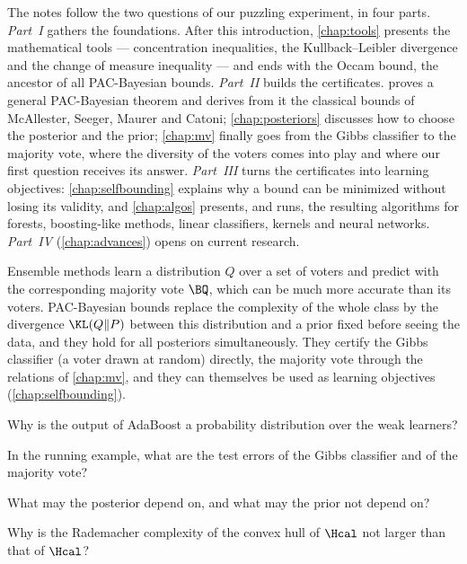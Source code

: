 The notes follow the two questions of our puzzling experiment, in four parts.
\emph{Part~I} gathers the foundations. After this introduction,
\cref{chap:tools} presents the mathematical tools --- concentration
inequalities, the Kullback--Leibler divergence and the change of measure
inequality --- and ends with the Occam bound, the ancestor of all PAC-Bayesian
bounds. \emph{Part~II} builds the certificates.  proves a
general PAC-Bayesian theorem and derives from it the classical bounds of
McAllester, Seeger, Maurer and Catoni; \cref{chap:posteriors} discusses how to
choose the posterior and the prior; \cref{chap:mv} finally goes from the Gibbs
classifier to the majority vote, where the diversity of the voters comes into
play and where our first question receives its answer. \emph{Part~III} turns the
certificates into learning objectives: \cref{chap:selfbounding} explains why a
bound can be minimized without losing its validity, and \cref{chap:algos}
presents, and runs, the resulting algorithms for forests, boosting-like methods,
linear classifiers, kernels and neural networks. \emph{Part~IV}
(\cref{chap:advances}) opens on current research.

\begin{keypoints}
Ensemble methods learn a distribution $Q$ over a set of voters and predict with
the corresponding majority vote $\BQ$, which can be much more accurate than its
voters. PAC-Bayesian bounds replace the complexity of the whole class by the
divergence $\KL(Q\|P)$ between this distribution and a prior fixed before seeing
the data, and they hold for all posteriors simultaneously. They certify the Gibbs
classifier (a voter drawn at random) directly, the majority vote through the
relations of \cref{chap:mv}, and they can themselves be used as learning
objectives (\cref{chap:selfbounding}).
\end{keypoints}

\begin{quickchecks}
\item Why is the output of AdaBoost a probability distribution over the weak learners?
\item In the running example, what are the test errors of the Gibbs classifier and of the majority vote?
\item What may the posterior depend on, and what may the prior not depend on?
\item Why is the Rademacher complexity of the convex hull of $\Hcal$ not larger than that of $\Hcal$?
\end{quickchecks}


